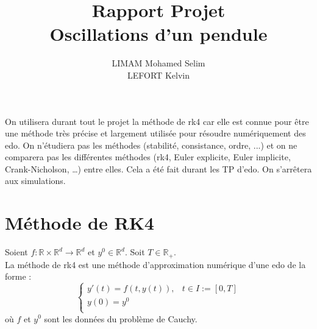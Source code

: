 \documentclass[9pt,a4paper]{article}
\title{Rapport Projet\\
Oscillations d'un pendule}
\author{LIMAM Mohamed Selim\\LEFORT Kelvin}
\begin{document}
\maketitle
\newpage
{}
\rfoot{\thepage}
\pagestyle{fancy}
\tableofcontents %
\newpage


On utilisera durant tout le projet la méthode de \gls{rk4} car elle est connue pour être une méthode très précise et largement utilisée pour résoudre numériquement des \gls{edo}. On n’étudiera pas les méthodes (stabilité, consistance, ordre, ...) et on ne comparera pas les différentes méthodes (\gls{rk4}, Euler explicite, Euler implicite, Crank-Nicholson, …) entre elles. Cela a été fait durant les TP d’\gls{edo}. On s'arrêtera aux simulations.

\section{Méthode de RK4}
Soient $f : \mathbb{R} \times \mathbb{R}^d \longrightarrow \mathbb{R}^d$ et $y^0 \in \mathbb{R}^d$. Soit $T \in \mathbb{R}_+$. \\
La méthode de \gls{rk4} est une méthode d'approximation numérique d'une \gls{edo} de la forme :
$$
\left\{
  \begin{array}{lcl}
    y'(t) = f(t, y(t)), & t \in I := [0, T] \\
    y(0) = y^0 \\
  \end{array}
\right.
$$
où $f$ et $y^0$ sont les données du problème de Cauchy.
\end{document}
